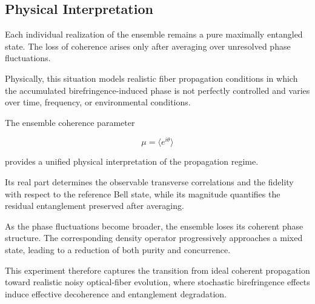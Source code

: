 
\subsection{Physical Interpretation}

Each individual realization of the ensemble remains a pure maximally entangled state. The loss of coherence arises only after averaging over unresolved phase fluctuations.

Physically, this situation models realistic fiber propagation conditions in which the accumulated birefringence-induced phase is not perfectly controlled and varies over time, frequency, or environmental conditions.

The ensemble coherence parameter

\[
\mu
=
\langle e^{i\theta} \rangle
\]

provides a unified physical interpretation of the propagation regime.

Its real part determines the observable transverse correlations and the fidelity with respect to the reference Bell state, while its magnitude quantifies the residual entanglement preserved after averaging.

As the phase fluctuations become broader, the ensemble loses its coherent phase structure. The corresponding density operator progressively approaches a mixed state, leading to a reduction of both purity and concurrence.

This experiment therefore captures the transition from ideal coherent propagation toward realistic noisy optical-fiber evolution, where stochastic birefringence effects induce effective decoherence and entanglement degradation.